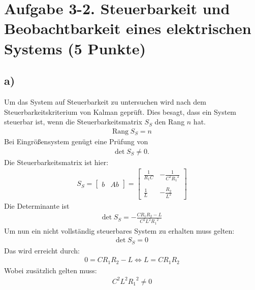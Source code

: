 \documentclass[11pt]{scrartcl} %
\begin{document}
\section*{Aufgabe 3-2. Steuerbarkeit und Beobachtbarkeit eines elektrischen Systems (5 Punkte)}
\subsection*{a)}
Um das System auf Steuerbarkeit zu untersuchen wird nach dem Steuerbarkeitskriterium von Kalman geprüft. Dies besagt, dass ein System steuerbar ist, wenn die Steuerbarkeitsmatrix $S_S$ den Rang $n$ hat.
\begin{align*}
\text{Rang} \hspace{3pt} S_S = n
\end{align*}
Bei Eingrößensystem genügt eine Prüfung von
\begin{align*}
\text{det} \hspace{3pt} S_S \neq 0.
\end{align*}
Die Steuerbarkeitsmatrix ist hier:
\begin{align*}
S_S=\begin{bmatrix}
b & Ab
\end{bmatrix} =
\begin{bmatrix}
\frac{1}{R_1C} & -\frac{1}{C^2{R_1}^2} \\\\
\frac{1}{L} & -\frac{R_2}{L^2}
\end{bmatrix}
\end{align*}
Die Determinante ist
\begin{align*}
\text{det} \hspace{3pt} S_S=-\frac{CR_1R_2-L}{C^2L^2{R_1}^2}
\end{align*}
Um nun ein nicht vollständig steuerbares System zu erhalten muss gelten:
\begin{align*}
\text{det} \hspace{3pt} S_S=0
\end{align*}
Das wird erreicht durch:
\begin{align*}
0=CR_1R_2-L\Leftrightarrow L=CR_1R_2
\end{align*}
Wobei zusätzlich gelten muss:
\begin{align*}
C^2L^2{R_1}^2 \neq 0
\end{align*}
\end{document}
